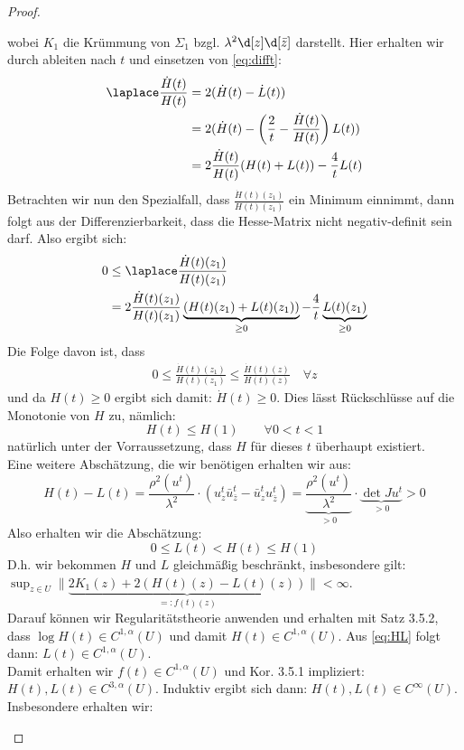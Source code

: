 \begin{proof}
\begin{itemize}
\[      \]
      wobei $K_1$ die Krümmung von $\Sigma_1$ bzgl. $\lambda^2\d[z] \d[\bar z]$ darstellt. Hier erhalten wir durch ableiten nach $t$ und einsetzen von \eqref{eq:difft}:
      \begin{align*}
	\laplace \frac{\dot H(t)}{H(t)} & = 2(\dot H(t) - \dot L(t)) \\
	& = 2( \dot H(t) - \left (\frac2t - \frac{\dot H(t)}{H(t)} \right) L(t)) \\
	& = 2 \frac{\dot H(t)}{H(t)}(H(t) + L(t)) - \frac4t L(t)
      \end{align*}
      Betrachten wir nun den Spezialfall, dass $\frac{\dot H(t)(z_1)}{H(t)(z_1)}$ ein Minimum einnimmt, dann folgt aus der Differenzierbarkeit, dass die Hesse-Matrix nicht negativ-definit sein darf. Also ergibt sich:
      \begin{align*}
	0 & \leq \laplace \frac{\dot H(t)(z_1)}{H(t)(z_1)} \\
	& =  2 \frac{\dot H(t)(z_1)}{H(t)(z_1)} \underbrace{(H(t)(z_1) + L(t)(z_1))}_{ \geq 0} - \frac4t \underbrace{L(t)(z_1)}_{\geq 0}
      \end{align*}
      Die Folge davon ist, dass
      \begin{align*}
	0 \leq \frac{\dot H(t)(z_1)}{H(t)(z_1)} \leq \frac{\dot H(t)(z)}{H(t)(z)} \quad \forall z
      \end{align*}
      und da $H(t) \geq 0$ ergibt sich damit: $\dot H(t) \geq 0$. Dies lässt Rückschlüsse auf die Monotonie von $H$ zu, nämlich:
      \[
      H(t) \leq H(1) \qquad \forall 0 < t < 1
      \]
      natürlich unter der Vorraussetzung, dass $H$ für dieses $t$ überhaupt existiert. \\
      Eine weitere Abschätzung, die wir benötigen erhalten wir aus:
      \[
      H(t) - L(t) = \frac{\rho^2(u^t)}{\lambda^2} \cdot ( u^t_z \bar u^t_{\bar z} - \bar u^t_z u^t_{\bar z} ) = \underbrace{\frac{\rho^2(u^t)}{\lambda^2}}_{> 0} \cdot \underbrace{ \det Ju^t }_{> 0} > 0
      \]
      Also erhalten wir die Abschätzung:
      \[
      0 \leq L(t) < H(t) \leq H(1)
      \]
      D.h. wir bekommen $H$ und $L$ gleichmäßig beschränkt, insbesondere gilt: $\sup_{z \in U} \| \underbrace{2K_1(z) + 2(H(t)(z) - L(t)(z))}_{=:f(t)(z)} \| < \infty$. \\
      Darauf können wir Regularitätstheorie anwenden und erhalten mit Satz 3.5.2, dass $\log H(t) \in C^{1,\alpha}(U)$ und damit $H(t) \in C^{1,\alpha}(U)$. Aus \eqref{eq:HL} folgt dann: $L(t) \in C^{1, \alpha}(U)$. \\
      Damit erhalten wir $f(t) \in C^{1,\alpha}(U)$ und Kor. 3.5.1 impliziert: $H(t),L(t) \in C^{3,\alpha}(U)$. Induktiv ergibt sich dann: $H(t), L(t) \in C^\infty(U)$. Insbesondere erhalten wir:

\end{itemize}
\end{proof}
